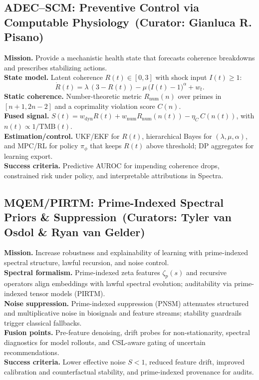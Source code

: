 \documentclass[11pt]{article}
\theoremstyle{plain}
\begin{document}
\subsection{ADEC--SCM: Preventive Control via Computable Physiology \,(Curator: Gianluca R. Pisano)}
\textbf{Mission.} Provide a mechanistic health state that forecasts coherence breakdowns and prescribes stabilizing actions.\\
\textbf{State model.} Latent coherence $R(t)\in[0,3]$ with shock input $I(t)\ge 1$:
\[
\dot{R}(t)=\lambda\,(3-R(t))-\mu\,\big(I(t)-1\big)^{\alpha}+w_t.
\]
\textbf{Static coherence.} Number-theoretic metric $R_{\text{num}}(n)$ over primes in $[n+1,2n-2]$ and a coprimality violation score $C(n)$.\\
\textbf{Fused signal.} $S(t)=w_{\text{dyn}}R(t)+w_{\text{num}}R_{\text{num}}(n(t))-\eta_C\,C(n(t))$, with $n(t)\propto 1/\mathrm{TMB}(t)$.\\
\textbf{Estimation/control.} UKF/EKF for $R(t)$, hierarchical Bayes for $(\lambda,\mu,\alpha)$, and MPC/RL for policy $\pi_\phi$ that keeps $R(t)$ above threshold; DP aggregates for learning export.\\
\textbf{Success criteria.} Predictive AUROC for impending coherence drops, constrained risk under policy, and interpretable attributions in Spectra.

\subsection{MQEM/PIRTM: Prime-Indexed Spectral Priors \& Suppression \,(Curators: Tyler van Osdol \& Ryan van Gelder)}
\textbf{Mission.} Increase robustness and explainability of learning with prime-indexed spectral structure, lawful recursion, and noise control.\\
\textbf{Spectral formalism.} Prime-indexed zeta features $\zeta_p(s)$ and recursive operators align embeddings with lawful spectral evolution; auditability via prime-indexed tensor models (PIRTM).\\
\textbf{Noise suppression.} Prime-indexed suppression (PNSM) attenuates structured and multiplicative noise in biosignals and feature streams; stability guardrails trigger classical fallbacks.\\
\textbf{Fusion points.} Pre-feature denoising, drift probes for non-stationarity, spectral diagnostics for model rollouts, and CSL-aware gating of uncertain recommendations.\\
\textbf{Success criteria.} Lower effective noise $S<1$, reduced feature drift, improved calibration and counterfactual stability, and prime-indexed provenance for audits.
\end{document}
